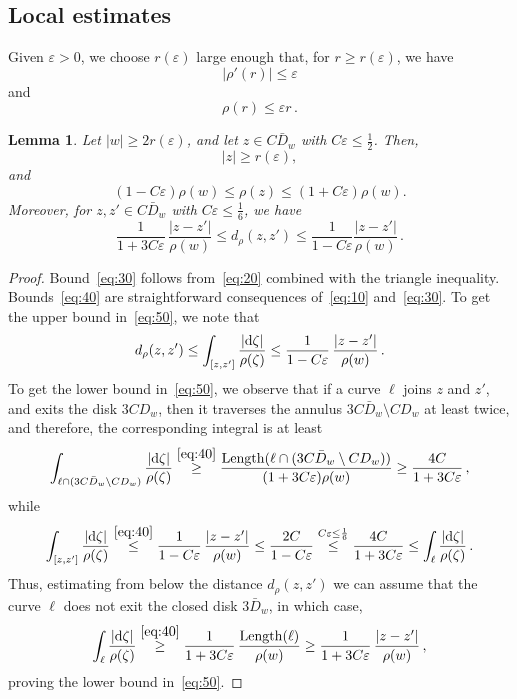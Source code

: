 \documentclass[11pt]{amsart}
\numberwithin{equation}{section}
\newtheorem{lemma}{Lemma}[section]
\def\ep{{\varepsilon}}
\begin{document}
\subsection{Local estimates}

Given $\ep>0$, we choose $r(\ep)$ large enough that, for $r\ge r(\ep)$, we have
\begin{equation}\label{eq:10}
|\rho'(r)|\le \ep
\end{equation}
and
\begin{equation}\label{eq:20}
\rho (r)\le \ep r\,.
\end{equation}

\begin{lemma}\label{LemmaA}
Let $|w|\ge 2r(\ep)$, and let $z\in C\bar D_w$ with $C\ep \le \tfrac12$. Then,
\begin{equation}\label{eq:30}
|z|\ge r(\ep),
\end{equation}
and
\begin{equation}\label{eq:40}
(1-C\ep)\rho(w) \le \rho(z) \le (1+C\ep)\rho(w).
\end{equation}
Moreover, for $z, z'\in C\bar D_w$ with $C\ep \le \tfrac16$, we have
\begin{equation}\label{eq:50}
\frac1{1+3C\ep}\, \frac{|z-z'|}{\rho(w)} \le d_\rho(z, z') \le \frac1{1-C\ep}
\frac{|z-z'|}{\rho(w)}\,.
\end{equation}
\end{lemma}

\begin{proof}
Bound~\eqref{eq:30} follows from~\eqref{eq:20} combined with the triangle inequality. Bounds~\eqref{eq:40} are straightforward consequences of~\eqref{eq:10} and~\eqref{eq:30}.
To get the upper bound in~\eqref{eq:50}, we note that
\[
d_\rho(z, z') \le \int_{[z, z']} \frac{|{\rm d}\zeta|}{\rho(\zeta)} \le
\frac1{1-C\ep}\, \frac{|z-z'|}{\rho(w)}\,.
\]
To get the lower bound in~\eqref{eq:50}, we observe that if a curve $\ell$ joins $z$ and $z'$,
and exits the disk $3CD_w$, then it traverses the annulus
$3C\bar D_w\setminus CD_w$ at least twice, and therefore, the corresponding integral 
is at least
\[
\int_{\ell\cap(3C\bar D_w\setminus CD_w)} \frac{|{\rm d}\zeta|}{\rho(\zeta)}
\stackrel{\eqref{eq:40}}\ge \frac{{\rm Length}(\ell \cap(3C\bar D_w\setminus CD_w))}{(1+3C\ep)\rho(w)}
\ge \frac{4C}{1+3C\ep}\,,
\]
while
\[
\int_{[z, z']} \frac{|{\rm d}\zeta|}{\rho(\zeta)} \stackrel{\eqref{eq:40}}\le
\frac1{1-C\ep}\, \frac{|z-z'|}{\rho(w)}
\le \frac{2C}{1-C\ep} \stackrel{C\ep\le\frac16}\le \frac{4C}{1+3C\ep}
\le  \int_{\ell} \frac{|{\rm d}\zeta|}{\rho(\zeta)}\,.
\]
Thus, estimating from below the distance $d_\rho(z, z')$ we can assume that the curve $\ell$ does not
exit the closed disk $3\bar D_w$, in which case,
\[
\int_\ell  \frac{|{\rm d}\zeta|}{\rho(\zeta)} \stackrel{\eqref{eq:40}}\ge \frac1{1+3C\ep}\,
\frac{{\rm Length}(\ell)}{\rho(w)} \ge \frac1{1+3C\ep}\,
\frac{|z-z'|}{\rho(w)}\,,
\]
proving the lower bound in~\eqref{eq:50}. 
\end{proof}
\end{document}
